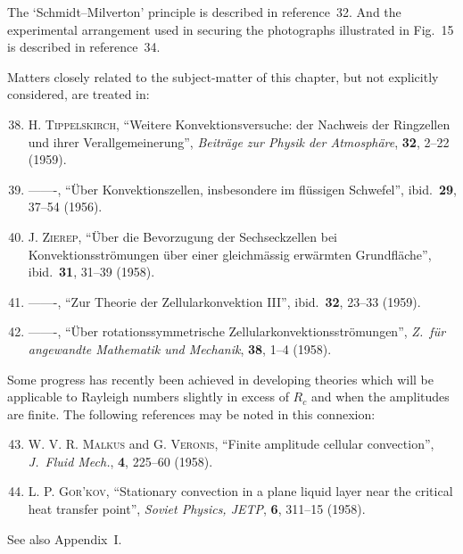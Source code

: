 \noindent The `Schmidt--Milverton' principle is described in reference~32. And the experimental
arrangement used in securing the photographs illustrated in Fig.~15 is
described in reference~34.

\medskip

\noindent Matters closely related to the subject-matter of this chapter, but not explicitly
considered, are treated in:

\begin{enumerate}
\setcounter{enumi}{37}

\item \textsc{H. Tippelskirch}, ``Weitere Konvektionsversuche: der Nachweis der
  Ringzellen und ihrer Verallgemeinerung'', \textit{Beitr\"age zur Physik der
  Atmosph\"are}, \textbf{32}, 2--22 (1959).

\item -------, ``\"Uber Konvektionszellen, insbesondere im fl\"ussigen Schwefel'',
  ibid.\ \textbf{29}, 37--54 (1956).

\item \textsc{J. Zierep}, ``\"Uber die Bevorzugung der Sechseckzellen bei Konvektionsstr\"omungen
  \"uber einer gleichm\"assig erw\"armten Grundfl\"ache'', ibid.\ \textbf{31}, 31--39
  (1958).

\item -------, ``Zur Theorie der Zellularkonvektion III'', ibid.\ \textbf{32}, 23--33 (1959).

\item -------, ``\"Uber rotationssymmetrische Zellularkonvektionsstr\"omungen'',
  \textit{Z.\ f\"ur angewandte Mathematik und Mechanik}, \textbf{38}, 1--4 (1958).

\end{enumerate}

\noindent Some progress has recently been achieved in developing theories which will be
applicable to Rayleigh numbers slightly in excess of $R_c$ and when the amplitudes
are finite. The following references may be noted in this connexion:

\begin{enumerate}
\setcounter{enumi}{42}

\item \textsc{W. V. R. Malkus} and \textsc{G. Veronis}, ``Finite amplitude cellular convection'',
  \textit{J.\ Fluid Mech.}, \textbf{4}, 225--60 (1958).

\item \textsc{L. P. Gor'kov}, ``Stationary convection in a plane liquid layer near the
  critical heat transfer point'', \textit{Soviet Physics, JETP}, \textbf{6}, 311--15 (1958).

\end{enumerate}

\noindent See also Appendix~I.
